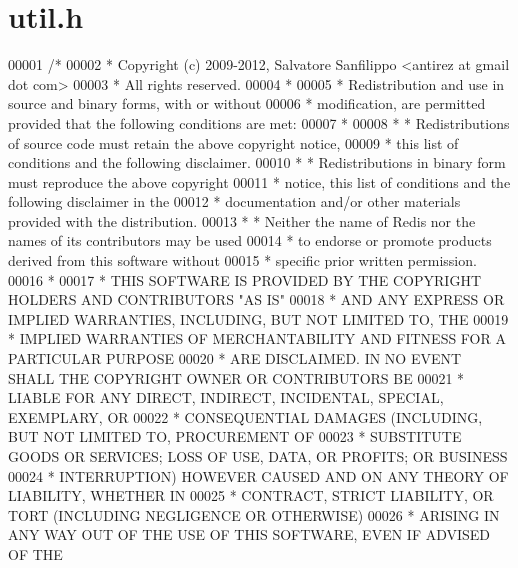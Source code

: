 \hypertarget{util_8h_source}{}\section{util.\+h}
\label{util_8h_source}

\begin{DoxyCode}
00001 \textcolor{comment}{/*}
00002 \textcolor{comment}{ * Copyright (c) 2009-2012, Salvatore Sanfilippo <antirez at gmail dot com>}
00003 \textcolor{comment}{ * All rights reserved.}
00004 \textcolor{comment}{ *}
00005 \textcolor{comment}{ * Redistribution and use in source and binary forms, with or without}
00006 \textcolor{comment}{ * modification, are permitted provided that the following conditions are met:}
00007 \textcolor{comment}{ *}
00008 \textcolor{comment}{ *   * Redistributions of source code must retain the above copyright notice,}
00009 \textcolor{comment}{ *     this list of conditions and the following disclaimer.}
00010 \textcolor{comment}{ *   * Redistributions in binary form must reproduce the above copyright}
00011 \textcolor{comment}{ *     notice, this list of conditions and the following disclaimer in the}
00012 \textcolor{comment}{ *     documentation and/or other materials provided with the distribution.}
00013 \textcolor{comment}{ *   * Neither the name of Redis nor the names of its contributors may be used}
00014 \textcolor{comment}{ *     to endorse or promote products derived from this software without}
00015 \textcolor{comment}{ *     specific prior written permission.}
00016 \textcolor{comment}{ *}
00017 \textcolor{comment}{ * THIS SOFTWARE IS PROVIDED BY THE COPYRIGHT HOLDERS AND CONTRIBUTORS "AS IS"}
00018 \textcolor{comment}{ * AND ANY EXPRESS OR IMPLIED WARRANTIES, INCLUDING, BUT NOT LIMITED TO, THE}
00019 \textcolor{comment}{ * IMPLIED WARRANTIES OF MERCHANTABILITY AND FITNESS FOR A PARTICULAR PURPOSE}
00020 \textcolor{comment}{ * ARE DISCLAIMED. IN NO EVENT SHALL THE COPYRIGHT OWNER OR CONTRIBUTORS BE}
00021 \textcolor{comment}{ * LIABLE FOR ANY DIRECT, INDIRECT, INCIDENTAL, SPECIAL, EXEMPLARY, OR}
00022 \textcolor{comment}{ * CONSEQUENTIAL DAMAGES (INCLUDING, BUT NOT LIMITED TO, PROCUREMENT OF}
00023 \textcolor{comment}{ * SUBSTITUTE GOODS OR SERVICES; LOSS OF USE, DATA, OR PROFITS; OR BUSINESS}
00024 \textcolor{comment}{ * INTERRUPTION) HOWEVER CAUSED AND ON ANY THEORY OF LIABILITY, WHETHER IN}
00025 \textcolor{comment}{ * CONTRACT, STRICT LIABILITY, OR TORT (INCLUDING NEGLIGENCE OR OTHERWISE)}
00026 \textcolor{comment}{ * ARISING IN ANY WAY OUT OF THE USE OF THIS SOFTWARE, EVEN IF ADVISED OF THE}

\end{DoxyCode}
